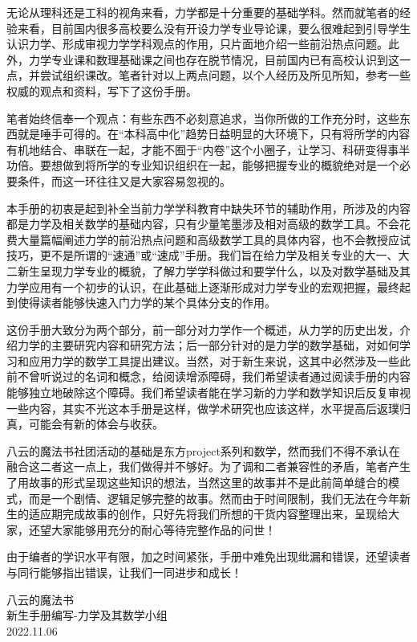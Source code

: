  {\itshapeCJK
  无论从理科还是工科的视角来看，力学都是十分重要的基础学科。然而就笔者的经验来看，目前国内很多高校要么没有开设力学专业导论课，要么很难起到引导学生认识力学、形成审视力学学科观点的作用，只片面地介绍一些前沿热点问题。此外，力学专业课和数理基础课之间也存在脱节情况，目前国内已有高校认识到这一点，并尝试组织课改。笔者针对以上两点问题，以个人经历及所见所知，参考一些权威的观点和资料，写下了这份手册。

  笔者始终信奉一个观点：有些东西不必刻意追求，当你所做的工作充分时，这些东西就是唾手可得的。在“本科高中化”趋势日益明显的大环境下，只有将所学的内容有机地结合、串联在一起，才能不囿于“内卷”这个小圈子，让学习、科研变得事半功倍。要想做到将所学的专业知识组织在一起，能够把握专业的概貌绝对是一个必要条件，而这一环往往又是大家容易忽视的。

  本手册的初衷是起到补全当前力学学科教育中缺失环节的辅助作用，所涉及的内容都是力学及相关数学的基础内容，只有少量笔墨涉及相对高级的数学工具。不会花费大量篇幅阐述力学的前沿热点问题和高级数学工具的具体内容，也不会教授应试技巧，更不是所谓的“速通”或“速成”手册。我们旨在给力学及相关专业的大一、大二新生呈现力学专业的概貌，了解力学学科做过和要学什么，以及对数学基础及其力学应用有一个初步的认识，在此基础上逐渐形成对力学专业的宏观把握，最终起到使得读者能够快速入门力学的某个具体分支的作用。

  这份手册大致分为两个部分，前一部分对力学作一个概述，从力学的历史出发，介绍力学的主要研究内容和研究方法；后一部分针对的是力学的数学基础，对如何学习和应用力学的数学工具提出建议。当然，对于新生来说，这其中必然涉及一些此前不曾听说过的名词和概念，给阅读增添障碍，我们希望读者通过阅读手册的内容能够独立地破除这个障碍。我们希望读者能在学习新的力学和数学知识后反复审视一些内容，其实不光这本手册是这样，做学术研究也应该这样，水平提高后返璞归真，可能会有新的体会与收获。

  八云的魔法书社团活动的基础是东方project系列和数学，然而我们不得不承认在融合这二者这一点上，我们做得并不够好。为了调和二者兼容性的矛盾，笔者产生了用故事的形式呈现这些知识的想法，当然这里的故事并不是此前简单缝合的模式，而是一个剧情、逻辑足够完整的故事。然而由于时间限制，我们无法在今年新生的适应期完成故事的创作，只好先将我们所想的干货内容整理出来，呈现给大家，还望大家能够用充分的耐心等待完整作品的问世！

  由于编者的学识水平有限，加之时间紧张，手册中难免出现纰漏和错误，还望读者与同行能够指出错误，让我们一同进步和成长！
 }

\begin{flushright}
	八云的魔法书\\
	新生手册编写-力学及其数学小组\\
	2022.11.06
\end{flushright}





\restoregeometry